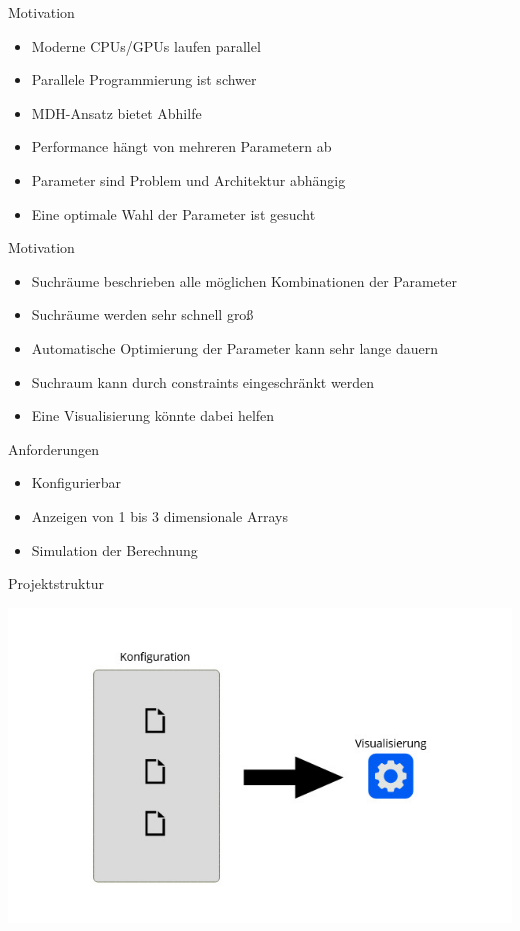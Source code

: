 \documentclass{presentation}
\begin{document}
\frame[plain]{\titlepage}

\begin{frame}{Motivation}
    \begin{itemize}
        \item Moderne CPUs/GPUs laufen parallel
        \item Parallele Programmierung ist schwer
        \item MDH-Ansatz bietet Abhilfe
        \item Performance hängt von mehreren Parametern ab
        \item Parameter sind Problem und Architektur abhängig
        \item Eine optimale Wahl der Parameter ist gesucht
    \end{itemize}
\end{frame}

\begin{frame}{Motivation}
    \begin{itemize}
        \item Suchräume beschrieben alle möglichen Kombinationen der Parameter
        \item Suchräume werden sehr schnell groß
        \item Automatische Optimierung der Parameter kann sehr lange dauern
        \item Suchraum kann durch constraints eingeschränkt werden
        \item Eine Visualisierung könnte dabei helfen
    \end{itemize}
\end{frame}

\begin{frame}{Anforderungen}
    \begin{itemize}
        \item Konfigurierbar
        \item Anzeigen von 1 bis 3 dimensionale Arrays
        \item Simulation der Berechnung
    \end{itemize}
\end{frame}

\begin{frame}{Projektstruktur}
    \begin{center}
        \includegraphics[width=\textwidth]{struktur_entwurf_1.jpg}
    \end{center}
\end{frame}
\end{document}
